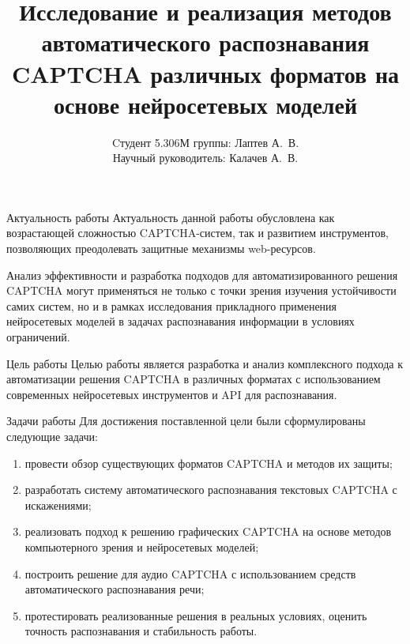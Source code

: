 \documentclass[12pt,a4paper,mathserif]{beamer}
\author[Лаптев А.В.]{{Cтудент 5.306М группы: Лаптев А.~В.}\\
{Научный руководитель: Калачев А.~В.}}
\title[Барнаул 2025]{\large Исследование и реализация методов автоматического распознавания CAPTCHA различных форматов на основе нейросетевых моделей}
\begin{document}
\begin{frame}
\maketitle
\end{frame}

\begin{frame}{Актуальность работы}
    \setlength{\parindent}{0.5cm}
    Актуальность данной работы обусловлена как возрастающей сложностью 
    CAPTCHA-систем, так и развитием инструментов, позволяющих преодолевать 
    защитные механизмы web-ресурсов.
    
    Анализ эффективности и разработка подходов для автоматизированного решения 
    CAPTCHA могут применяться не только с точки зрения изучения устойчивости 
    самих систем, но и в рамках исследования прикладного применения нейросетевых 
    моделей в задачах распознавания информации в условиях ограничений.
\end{frame}

\begin{frame}{Цель работы}
    \setlength{\parindent}{0.5cm}
    Целью работы является разработка и анализ комплексного подхода к 
    автоматизации решения CAPTCHA в различных форматах с использованием 
    современных нейросетевых инструментов и API для распознавания.
\end{frame}

\begin{frame}{Задачи работы}
    \setlength{\parindent}{0.5cm}
    Для достижения поставленной цели были сформулированы следующие задачи:

    \begin{enumerate}
        \item провести обзор существующих форматов CAPTCHA и методов их защиты;
        \item разработать систему автоматического распознавания текстовых CAPTCHA с 
        искажениями;
        \item реализовать подход к решению графических CAPTCHA на основе методов 
        компьютерного зрения и нейросетевых моделей;
        \item построить решение для аудио CAPTCHA с использованием средств 
        автоматического распознавания речи;
        \item протестировать реализованные решения в реальных условиях, оценить 
        точность распознавания и стабильность работы.
    \end{enumerate}
\end{frame}
\end{document}
